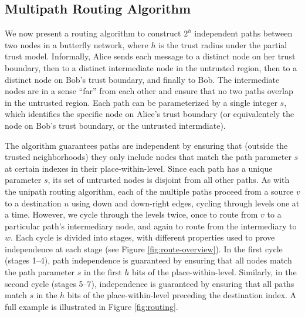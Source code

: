\documentclass[twocolumn]{article}
\begin{document}
\subsection{Multipath Routing Algorithm}

We now present a routing algorithm to construct $2^h$ independent paths
between two nodes in a butterfly network,
where $h$ is the trust radius under the partial trust model.
Informally, Alice sends each message to a distinct node on her
trust boundary, then to a distinct intermediate node in the untrusted region,
then to a distinct node on Bob's trust boundary, and finally to Bob.
The intermediate nodes are in a sense ``far'' from each other and ensure that
no two paths overlap in the untrusted region.
Each path can be parameterized by a single integer $s$, which identifies
the specific node on Alice's trust boundary
(or equivalentely the node on Bob's trust boundary, or the untrusted intermdiate).

The algorithm guarantees paths are independent by ensuring that
(outside the trusted neighborhoods)
they only include
nodes that match the path parameter $s$ at certain indexes in their
place-within-level.
Since each path has a unique parameter $s$,
its set of untrusted nodes is disjoint from all other paths.
As with the unipath routing algorithm,
each of the multiple paths proceed from a source $v$ to a destination $u$
using down and down-right edges,
cycling through levels one at a time.
However, we cycle through the levels twice, once to route from $v$ to a
particular path's intermediary node,
and again to route from the intermediary to $w$.
Each cycle is divided into stages,
with different properties used to prove independence at each stage
(see Figure \ref{fig:route-overview}).
In the first cycle (stages 1--4), path independence is guaranteed by ensuring that
all nodes match the path parameter $s$ in the first $h$ bits of the place-within-level.
Similarly, in the second cycle (stages 5--7),
independence is guaranteed by ensuring that all paths match $s$ in the
$h$ bits of the place-within-level preceding the destination index.
A full example is illustrated in Figure \ref{fig:routing}.
\end{document}
